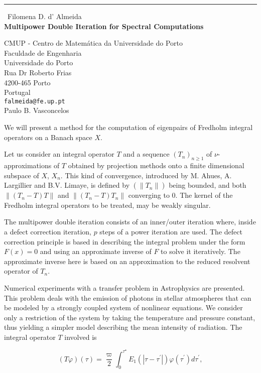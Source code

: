 \documentclass{report}
\begin{document}
\begin{center}
\rule{6in}{1pt} \
{\large Filomena D. d' Almeida \\
{\bf Multipower Double Iteration for Spectral Computations}}

CMUP - Centro de Matem\'{a}tica da Universidade do Porto \\ Faculdade de Engenharia \\ Universidade do Porto \\ Rua Dr Roberto Frias \\ 4200-465 Porto \\ Portugal
\\
{\tt falmeida@fe.up.pt}\\
Paulo B.  Vasconcelos\end{center}

We will present a method for the computation of eigenpairs of Fredholm
integral operators on a Banach space $X$.

Let us consider an integral operator $T$ and a sequence
$(T_n)_{n\geq1}$ of $\nu$-approximations of $T$ obtained by projection
methods onto a finite dimensional subspace of $X$, $X_n$.
This kind of convergence, introduced by M. Ahues, A. Largillier and B.V.
Limaye, is defined by
$(\left\| T_n \right\|)$
being bounded, and both $ \left\|(T_n - T)T \right\|$
and $\left\|(T_n - T)T_n \right\|$ converging to $0$.
The kernel of the Fredholm integral operators to be treated, may be weakly singular.

The multipower double iteration consists of an inner/outer iteration
where, inside a defect correction iteration, $p$ steps of a power
iteration are used.
The defect correction principle is based in describing the integral
problem under the form $F(x)=0$ and using an approximate inverse of $F$
to solve it iteratively.
The approximate inverse here is based on an approximation to the reduced
resolvent operator of $T_n$.


Numerical experiments with a transfer problem in Astrophysics are presented.
This problem deals with the emission of photons in stellar atmospheres that can be
modeled by a strongly coupled system of nonlinear equations.
We consider only a restriction of the system by taking the temperature
and pressure constant, thus yielding a simpler model describing the mean
intensity of radiation.
The integral operator $T$ involved is

$$
(T\varphi)(\tau)=\frac{\varpi}{2}\int_{0}^{\tau^{\star}}E_{1}\left(
\left\vert \tau-\tau^{\prime}\right\vert \right) \varphi\left( \tau^{\prime
}\right) d\tau^{\prime}, \label{fred_op}
$$
\end{document}
